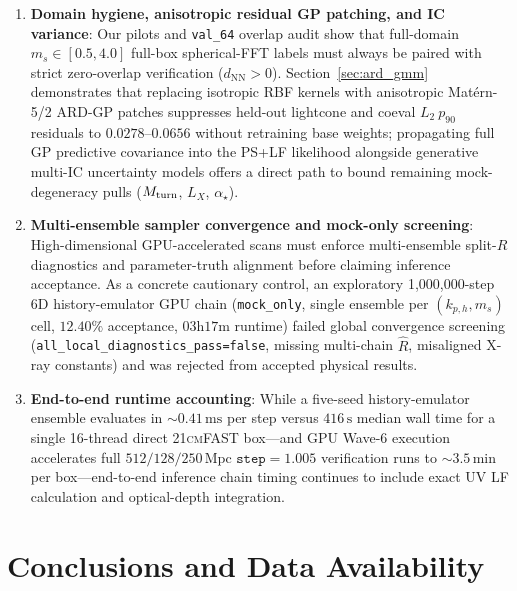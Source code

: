 \documentclass[aps,prd,reprint,superscriptaddress,nofootinbib,amsmath,amssymb,floatfix,longbibliography]{revtex4-2}
\begin{document}
\begin{enumerate}
\item \textbf{Domain hygiene, anisotropic residual GP patching, and IC variance}: Our pilots and \texttt{val\_64} overlap audit show that full-domain $m_s \in [0.5, 4.0]$ full-box spherical-FFT labels must always be paired with strict zero-overlap verification ($d_{\mathrm{NN}}>0$). Section~\ref{sec:ard_gmm} demonstrates that replacing isotropic RBF kernels with anisotropic Mat\'ern-5/2 ARD-GP patches suppresses held-out lightcone and coeval $L_2\ p_{90}$ residuals to $0.0278\text{--}0.0656$ without retraining base weights; propagating full GP predictive covariance into the PS+LF likelihood alongside generative multi-IC uncertainty models \cite{Breitman2026} offers a direct path to bound remaining mock-degeneracy pulls ($M_{\rm turn}$, $L_X$, $\alpha_\star$).
\item \textbf{Multi-ensemble sampler convergence and mock-only screening}: High-dimensional GPU-accelerated scans must enforce multi-ensemble split-$\widehat{R}$ diagnostics \cite{Vehtari2021} and parameter-truth alignment before claiming inference acceptance. As a concrete cautionary control, an exploratory 1,000,000-step 6D history-emulator GPU chain (\texttt{mock\_only}, single ensemble per $(k_{p,h}, m_s)$ cell, $12.40\%$ acceptance, $03\mathrm{h}17\mathrm{m}$ runtime) failed global convergence screening (\texttt{all\_local\_diagnostics\_pass=false}, missing multi-chain $\widehat{R}$, misaligned X-ray constants) and was rejected from accepted physical results.
\item \textbf{End-to-end runtime accounting}: While a five-seed history-emulator ensemble evaluates in $\sim 0.41\,\mathrm{ms}$ per step versus $416\,\mathrm{s}$ median wall time for a single 16-thread direct \textsc{21cmFAST} box---and GPU Wave-6 execution accelerates full $512/128/250\,\mathrm{Mpc}$ $\texttt{step}=1.005$ verification runs to $\sim 3.5\,\mathrm{min}$ per box---end-to-end inference chain timing continues to include exact UV LF calculation and optical-depth integration.
\end{enumerate}

\section{Conclusions and Data Availability}\label{sec:conclusions}
\end{document}
